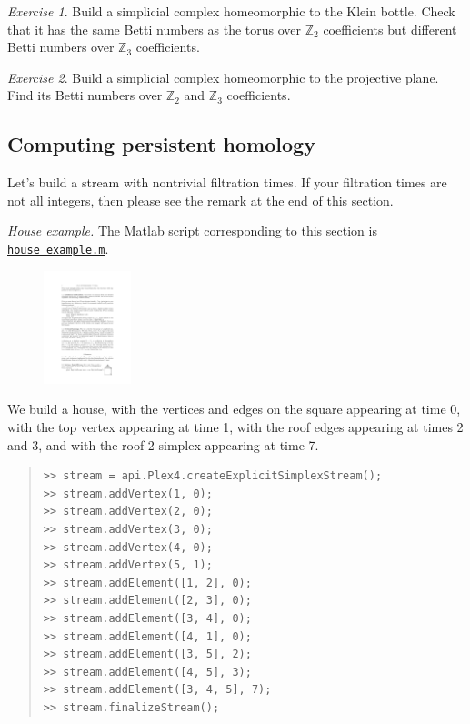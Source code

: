 \documentclass[amscd, amssymb, verbatim]{amsart}[12pt]
\theoremstyle{remark}
\newtheorem{exercise}{Exercise}
\theoremstyle{remark}
\theoremstyle{remark}
\begin{document}
\begin{exercise}
Build a simplicial complex homeomorphic to the Klein bottle. Check that it has the same Betti numbers as the torus over $\mathbb{Z}_2$ coefficients but different Betti numbers over $\mathbb{Z}_3$ coefficients. 
\end{exercise}

\begin{exercise}
Build a simplicial complex homeomorphic to the projective plane. Find its Betti numbers over $\mathbb{Z}_2$ and $\mathbb{Z}_3$ coefficients. 
\end{exercise}


\subsection{Computing persistent homology}\label{computingPersistentHomology}

Let's build a stream with nontrivial filtration times. If your filtration times are not all integers, then please see the remark at the end of this section.

{\em House example.} The Matlab script corresponding to this section is \href{https://github.com/appliedtopology/javaplex/tree/master/src/matlab/for_distribution/tutorial_examples/house_example.m}{\texttt{house\_example.m}}.

\begin{figure}
	\begin{center}
   	\includegraphics[width=1in]{houseFig.pdf}
  	\end{center}
\end{figure}

We build a house, with the vertices and edges on the square appearing at time 0, with the top vertex appearing at time 1, with the roof edges appearing at times 2 and 3, and with the roof 2-simplex appearing at time 7.

\begin{quote} \begin{verbatim}
>> stream = api.Plex4.createExplicitSimplexStream();
>> stream.addVertex(1, 0);
>> stream.addVertex(2, 0);
>> stream.addVertex(3, 0);
>> stream.addVertex(4, 0);
>> stream.addVertex(5, 1);
>> stream.addElement([1, 2], 0);
>> stream.addElement([2, 3], 0);
>> stream.addElement([3, 4], 0);
>> stream.addElement([4, 1], 0);
>> stream.addElement([3, 5], 2);
>> stream.addElement([4, 5], 3);
>> stream.addElement([3, 4, 5], 7);
>> stream.finalizeStream();
\end{verbatim} \end{quote}
\end{document}
